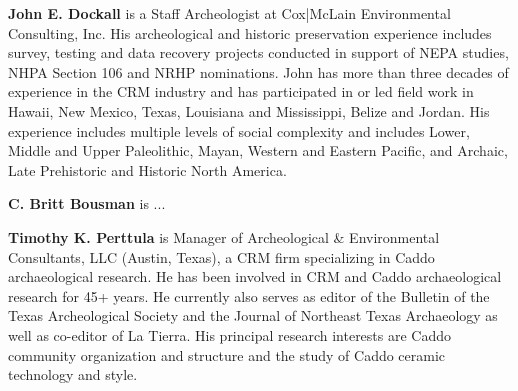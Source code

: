 \documentclass[review]{elsarticle}
\begin{document}
\textbf{John E. Dockall} is a Staff Archeologist at Cox|McLain Environmental Consulting, Inc. His archeological and historic preservation experience includes survey, testing and data recovery projects conducted in support of NEPA studies, NHPA Section 106 and NRHP nominations. John has more than three decades of experience in the CRM industry and has participated in or led field work in Hawaii, New Mexico, Texas, Louisiana and Mississippi, Belize and Jordan. His experience includes multiple levels of social complexity and includes Lower, Middle and Upper Paleolithic, Mayan, Western and Eastern Pacific, and Archaic, Late Prehistoric and Historic North America.

\textbf{C. Britt Bousman} is ...

\textbf{Timothy K. Perttula} is Manager of Archeological \& Environmental Consultants, LLC (Austin, Texas), a CRM firm specializing in Caddo archaeological research. He has been involved in CRM and Caddo archaeological research for 45+ years. He currently also serves as editor of the Bulletin of the Texas Archeological Society and the Journal of Northeast Texas Archaeology as well as co-editor of La Tierra. His principal research interests are Caddo community organization and structure and the study of Caddo ceramic technology and style.


\end{document}
